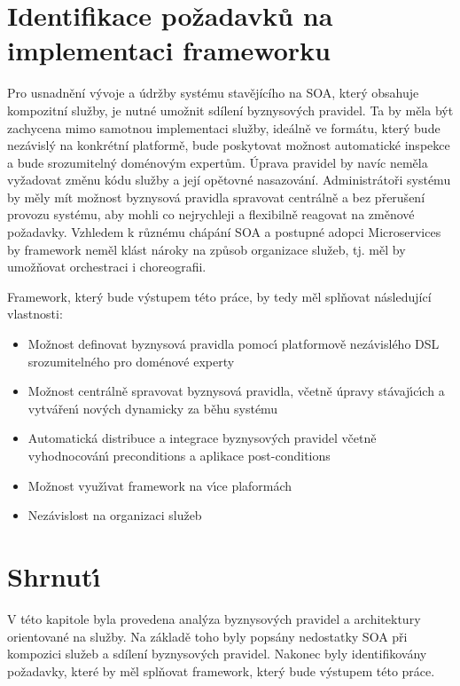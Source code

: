 \section{Identifikace požadavků na implementaci frameworku}\label{sec:implementation-requirements}

Pro usnadnění vývoje a údržby systému stavějícího na \gls{SOA}, který
obsahuje kompozitní služby, je nutné umožnit sdílení byznysových pravidel.
Ta by měla být zachycena mimo samotnou implementaci služby, ideálně ve formátu, který bude nezávislý na
konkrétní platformě, bude poskytovat možnost automatické inspekce a bude srozumitelný doménovým expertům.
Úprava pravidel by navíc neměla vyžadovat změnu kódu služby a její opětovné nasazování.
Administrátoři systému by měly mít možnost byznysová pravidla spravovat centrálně a bez
přerušení provozu systému, aby mohli co nejrychleji a flexibilně reagovat na změnové požadavky.
Vzhledem k různému chápání \gls{SOA} a postupné adopci Microservices by framework neměl klást
nároky na způsob organizace služeb, tj. měl by umožňovat orchestraci i choreografii.

Framework, který bude výstupem této práce, by tedy měl splňovat následující vlastnosti:

\begin{itemize}
    \item{Možnost definovat byznysová pravidla pomoc\'{\i} platformově nezávislého \gls{DSL} srozumitelného pro doménové experty}
    \item{Možnost centrálně spravovat byznysová pravidla, včetně úpravy stávaj\'{\i}c\'{\i}ch a vytvářen\'{\i} nov\'ych dynamicky za běhu systému}
    \item{Automatická distribuce a integrace byznysových pravidel včetně vyhodnocován\'{\i} preconditions a aplikace post-conditions}
    \item{Možnost využ\'{\i}vat framework na v\'{\i}ce plaformách}
    \item{Nezávislost na organizaci služeb}
\end{itemize}

\section{Shrnut\'{\i}}

V této kapitole byla provedena analýza byznysov\'ych pravidel a architektury orientované na služby.
Na základě toho byly popsány nedostatky \gls{SOA} při kompozici služeb a sdílení byznysových pravidel.
Nakonec byly identifikovány požadavky, které by měl splňovat framework, který bude v\'ystupem této práce.
